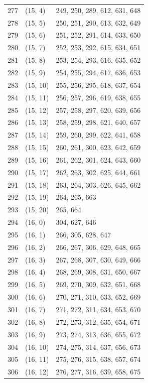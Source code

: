 \documentclass{article}
\begin{document}
\begin{longtable}{lll}
  277 & (15, 4) & 249, 250, 289, 612, 631, 648 \\
  278 & (15, 5) & 250, 251, 290, 613, 632, 649 \\
  279 & (15, 6) & 251, 252, 291, 614, 633, 650 \\
  280 & (15, 7) & 252, 253, 292, 615, 634, 651 \\
  281 & (15, 8) & 253, 254, 293, 616, 635, 652 \\
  282 & (15, 9) & 254, 255, 294, 617, 636, 653 \\
  283 & (15, 10) & 255, 256, 295, 618, 637, 654 \\
  284 & (15, 11) & 256, 257, 296, 619, 638, 655 \\
  285 & (15, 12) & 257, 258, 297, 620, 639, 656 \\
  286 & (15, 13) & 258, 259, 298, 621, 640, 657 \\
  287 & (15, 14) & 259, 260, 299, 622, 641, 658 \\
  288 & (15, 15) & 260, 261, 300, 623, 642, 659 \\
  289 & (15, 16) & 261, 262, 301, 624, 643, 660 \\
  290 & (15, 17) & 262, 263, 302, 625, 644, 661 \\
  291 & (15, 18) & 263, 264, 303, 626, 645, 662 \\
  292 & (15, 19) & 264, 265, 663 \\
  293 & (15, 20) & 265, 664 \\
  294 & (16, 0) & 304, 627, 646 \\
  295 & (16, 1) & 266, 305, 628, 647 \\
  296 & (16, 2) & 266, 267, 306, 629, 648, 665 \\
  297 & (16, 3) & 267, 268, 307, 630, 649, 666 \\
  298 & (16, 4) & 268, 269, 308, 631, 650, 667 \\
  299 & (16, 5) & 269, 270, 309, 632, 651, 668 \\
  300 & (16, 6) & 270, 271, 310, 633, 652, 669 \\
  301 & (16, 7) & 271, 272, 311, 634, 653, 670 \\
  302 & (16, 8) & 272, 273, 312, 635, 654, 671 \\
  303 & (16, 9) & 273, 274, 313, 636, 655, 672 \\
  304 & (16, 10) & 274, 275, 314, 637, 656, 673 \\
  305 & (16, 11) & 275, 276, 315, 638, 657, 674 \\
  306 & (16, 12) & 276, 277, 316, 639, 658, 675 \\

\end{longtable}
\end{document}
